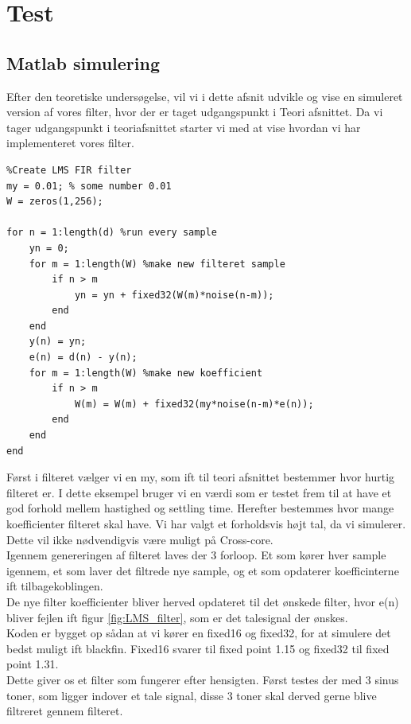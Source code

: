 \graphicspath{{Chapters/Test/}}


\section{Test}

\subsection{Matlab simulering}

Efter den teoretiske undersøgelse, vil vi i dette afsnit udvikle og vise en simuleret version af vores filter, hvor der er taget udgangspunkt i Teori afsnittet. Da vi tager udgangspunkt i teoriafsnittet starter vi med at vise hvordan vi har implementeret vores filter. 

\begin{lstlisting}
%Create LMS FIR filter
my = 0.01; % some number 0.01
W = zeros(1,256);

for n = 1:length(d) %run every sample 
    yn = 0;
    for m = 1:length(W) %make new filteret sample 
        if n > m
            yn = yn + fixed32(W(m)*noise(n-m));
        end
    end
    y(n) = yn;
    e(n) = d(n) - y(n);
    for m = 1:length(W) %make new koefficient  
        if n > m
            W(m) = W(m) + fixed32(my*noise(n-m)*e(n));
        end
    end
end
\end{lstlisting}

Først i filteret vælger vi en my, som ift til teori afsnittet bestemmer hvor hurtig filteret er. I dette eksempel bruger vi en værdi som er testet frem til at have et god forhold mellem hastighed og settling time. Herefter bestemmes hvor mange koefficienter filteret skal have. Vi har valgt et forholdsvis højt tal, da vi simulerer. Dette vil ikke nødvendigvis være muligt på Cross-core. \\

Igennem genereringen af filteret laves der 3 forloop. Et som kører hver sample igennem, et som laver det filtrede nye sample, og et som opdaterer koefficinterne ift tilbagekoblingen. \\
De nye filter koefficienter bliver herved opdateret til det ønskede filter, hvor e(n) bliver fejlen ift figur \ref{fig:LMS_filter}, som er det talesignal der ønskes. \\
Koden er bygget op sådan at vi kører en fixed16 og fixed32, for at simulere det bedst muligt ift blackfin. Fixed16 svarer til fixed point 1.15 og fixed32 til fixed point 1.31. 
\\
Dette giver os et filter som fungerer efter hensigten. Først testes der med 3 sinus toner, som ligger indover et tale signal, disse 3 toner skal derved gerne blive filtreret gennem filteret. 
\newpage
